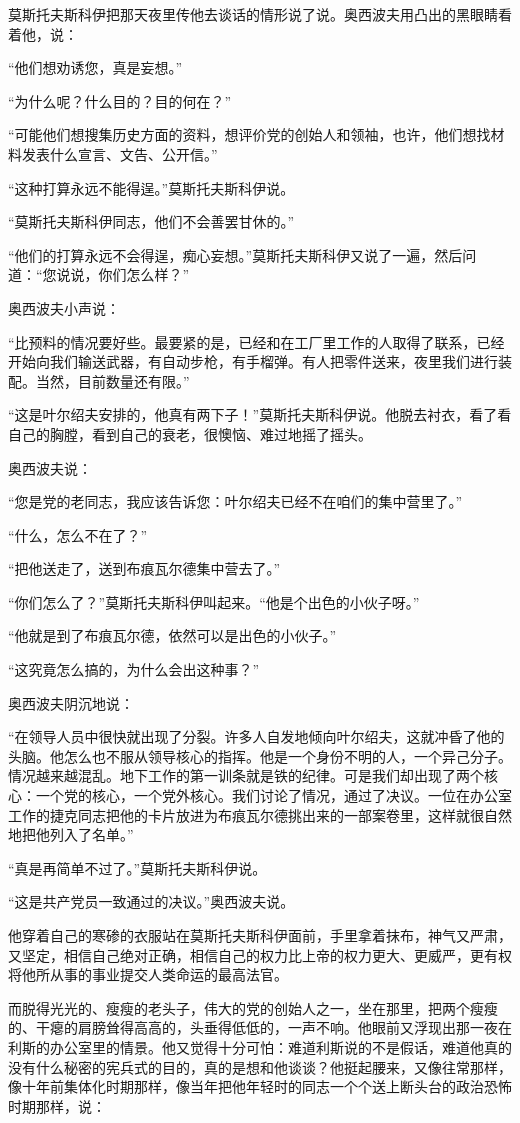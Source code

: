 莫斯托夫斯科伊把那天夜里传他去谈话的情形说了说。奥西波夫用凸出的黑眼睛看着他，说：

“他们想劝诱您，真是妄想。”

“为什么呢？什么目的？目的何在？”

“可能他们想搜集历史方面的资料，想评价党的创始人和领袖，也许，他们想找材料发表什么宣言、文告、公开信。”

“这种打算永远不能得逞。”莫斯托夫斯科伊说。

“莫斯托夫斯科伊同志，他们不会善罢甘休的。”

“他们的打算永远不会得逞，痴心妄想。”莫斯托夫斯科伊又说了一遍，然后问道：“您说说，你们怎么样？”

奥西波夫小声说：

“比预料的情况要好些。最要紧的是，已经和在工厂里工作的人取得了联系，已经开始向我们输送武器，有自动步枪，有手榴弹。有人把零件送来，夜里我们进行装配。当然，目前数量还有限。”

“这是叶尔绍夫安排的，他真有两下子！”莫斯托夫斯科伊说。他脱去衬衣，看了看自己的胸膛，看到自己的衰老，很懊恼、难过地摇了摇头。

奥西波夫说：

“您是党的老同志，我应该告诉您：叶尔绍夫已经不在咱们的集中营里了。”

“什么，怎么不在了？”

“把他送走了，送到布痕瓦尔德集中营去了。”

“你们怎么了？”莫斯托夫斯科伊叫起来。“他是个出色的小伙子呀。”

“他就是到了布痕瓦尔德，依然可以是出色的小伙子。”

“这究竟怎么搞的，为什么会出这种事？”

奥西波夫阴沉地说：

“在领导人员中很快就出现了分裂。许多人自发地倾向叶尔绍夫，这就冲昏了他的头脑。他怎么也不服从领导核心的指挥。他是一个身份不明的人，一个异己分子。情况越来越混乱。地下工作的第一训条就是铁的纪律。可是我们却出现了两个核心：一个党的核心，一个党外核心。我们讨论了情况，通过了决议。一位在办公室工作的捷克同志把他的卡片放进为布痕瓦尔德挑出来的一部案卷里，这样就很自然地把他列入了名单。”

“真是再简单不过了。”莫斯托夫斯科伊说。

“这是共产党员一致通过的决议。”奥西波夫说。

他穿着自己的寒碜的衣服站在莫斯托夫斯科伊面前，手里拿着抹布，神气又严肃，又坚定，相信自己绝对正确，相信自己的权力比上帝的权力更大、更威严，更有权将他所从事的事业提交人类命运的最高法官。

而脱得光光的、瘦瘦的老头子，伟大的党的创始人之一，坐在那里，把两个瘦瘦的、干瘪的肩膀耸得高高的，头垂得低低的，一声不响。他眼前又浮现出那一夜在利斯的办公室里的情景。他又觉得十分可怕：难道利斯说的不是假话，难道他真的没有什么秘密的宪兵式的目的，真的是想和他谈谈？他挺起腰来，又像往常那样，像十年前集体化时期那样，像当年把他年轻时的同志一个个送上断头台的政治恐怖时期那样，说：


